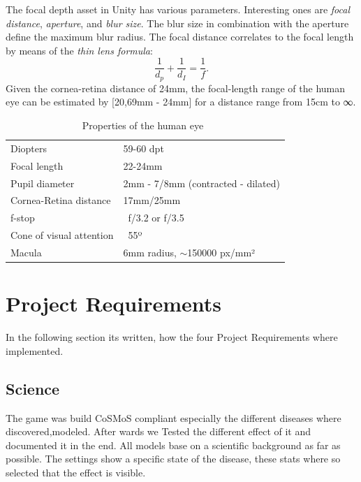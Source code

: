 \documentclass{sig-alternate-05-2015}
\begin{document}
The focal depth asset in Unity has various parameters. Interesting ones are \emph{focal distance}, \emph{aperture}, and \emph{blur size}.
The blur size in combination with the aperture define the maximum blur radius.
The focal distance correlates to the focal length by means of the \emph{thin lens formula}:
\begin{equation}
    \frac{1}{d_p} + \frac{1}{d_I} = \frac{1}{f}.
\end{equation}
Given the cornea-retina distance of 24mm, the focal-length range of the human eye can be estimated by [20,69mm - 24mm] for a distance range from 15cm to ∞.
%
\begin{table}
    \centering
    \begin{tabular}{ll}
        Diopters                & 59-60 dpt \\
        Focal length            & 22-24mm\\
        Pupil diameter          & 2mm - 7/8mm (contracted - dilated) \\
        Cornea-Retina distance  & 17mm/25mm \\
        f-stop                  & ~f/3.2 or f/3.5 \\
        Cone of visual attention& ~55º \\
        Macula                  & 6mm radius, $\sim$150000 px/mm²\\
    \end{tabular}
    \caption{Properties of the human eye~\cite{eye-focal, eyeascamera}}
    \label{tab:eyeproperties}
\end{table}


\section{Project Requirements}

In the following section its written, how the four Project Requirements where implemented.

\subsection{Science}

The game was build CoSMoS compliant especially the different diseases where discovered,modeled. After wards we Tested the different effect of it and documented it in the end. All models base on a scientific background as far as possible. The settings show a specific state of the disease, these stats where so selected that the effect is visible.
\end{document}

